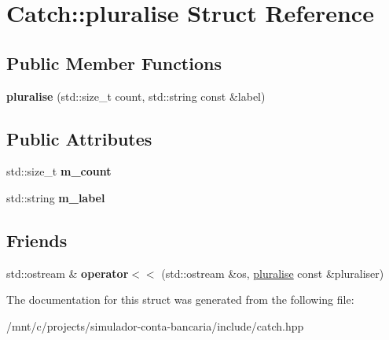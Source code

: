 \hypertarget{structCatch_1_1pluralise}{}\section{Catch\+:\+:pluralise Struct Reference}
\label{structCatch_1_1pluralise}
\subsection*{Public Member Functions}
\begin{DoxyCompactItemize}
\item 
\mbox{\label{structCatch_1_1pluralise_a5c55e22de2416cfe416edf715c6b9234}} 
{\bfseries pluralise} (std\+::size\+\_\+t count, std\+::string const \&label)
\end{DoxyCompactItemize}
\subsection*{Public Attributes}
\begin{DoxyCompactItemize}
\item 
\mbox{\label{structCatch_1_1pluralise_a4dce2fa13ec6f00fac09b2418265441e}} 
std\+::size\+\_\+t {\bfseries m\+\_\+count}
\item 
\mbox{\label{structCatch_1_1pluralise_a8849cbdd3f11ebe7747597c8644e8793}} 
std\+::string {\bfseries m\+\_\+label}
\end{DoxyCompactItemize}
\subsection*{Friends}
\begin{DoxyCompactItemize}
\item 
\mbox{\label{structCatch_1_1pluralise_aa7dac6b165514c1f85e0695d678fdef5}} 
std\+::ostream \& {\bfseries operator$<$$<$} (std\+::ostream \&os, \hyperlink{structCatch_1_1pluralise}{pluralise} const \&pluraliser)
\end{DoxyCompactItemize}


The documentation for this struct was generated from the following file\+:\begin{DoxyCompactItemize}
\item 
/mnt/c/projects/simulador-\/conta-\/bancaria/include/catch.\+hpp\end{DoxyCompactItemize}
